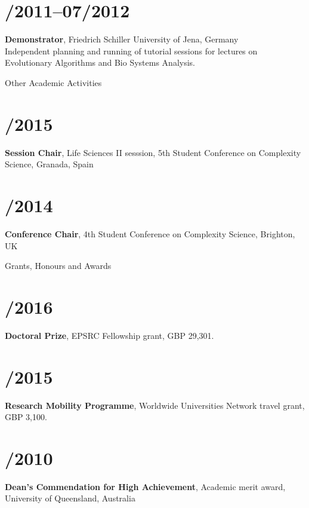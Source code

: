 \documentclass[margin,line]{res}
\begin{document}
\begin{resume}
\section{/2011--07/2012}{\bf Demonstrator}, Friedrich Schiller University of Jena, Germany\\
Independent planning and running of tutorial sessions for lectures on Evolutionary Algorithms and Bio Systems Analysis.\\

\vspace*{-.2in}

{\sc Other Academic Activities}\\
\vspace*{-.35in}
\section{/2015}{\bf Session Chair}, Life Sciences II sesssion, 5th Student Conference on Complexity Science, Granada, Spain\\
\vspace*{-.35in}
\section{/2014}{\bf Conference Chair}, 4th Student Conference on Complexity Science, Brighton, UK\\

\vspace*{-.2in}

{\sc Grants, Honours and Awards}\\
\vspace*{-.35in}
\section{/2016}{\bf Doctoral Prize}, EPSRC Fellowship grant, GBP 29,301.\\
\vspace*{-.35in}
\section{/2015}{\bf Research Mobility Programme}, Worldwide Universities Network travel grant, GBP 3,100.\\        
\vspace*{-.35in}
\section{/2010}{\bf Dean's Commendation for High Achievement}, Academic merit award, University of Queensland, Australia\\
\vspace*{-.35in}

\end{resume}
\end{document}
